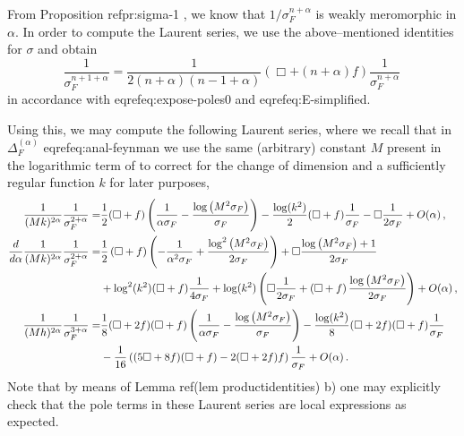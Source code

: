 \documentclass[10pt]{book}
\theoremstyle{break}
\begin{document}
\bigskip


From Proposition ref{pr:sigma-1} , we know that $1/\sigma^{n+\alpha}_F$ is weakly meromorphic in $\alpha$. In order to compute the Laurent series, we use the above--mentioned identities for $\sigma$ and obtain
$$
\frac{1}{\sigma^{n+1+\alpha}_F}=\frac{1}{2(n+\alpha)(n-1+\alpha)}\left(\Box+(n+\alpha)f\right)\frac{1}{\sigma^{n+\alpha}_F}\,
$$
in accordance with eqref{eq:expose-poles0} and eqref{eq:E-simplified}.


\bigskip


Using this, we may compute the following Laurent series, where we recall that in $\Delta^{(\alpha)}_F$ eqref{eq:anal-feynman} we use the same (arbitrary) constant $M$ present in the logarithmic term  of %
to correct for the change of dimension and a sufficiently regular function $k$ for later purposes,
\begin{align}\frac{1}{(Mk)^{2\alpha}}\frac{1}{\sigma^{2+\alpha}_F}=&\frac{1}{2}(\Box+f)\left(\frac{1}{\alpha\sigma_F}-\frac{\log \left(M^2 \sigma_F\right)}{\sigma_F}\right)-\frac{\log(k^2)}{2}(\Box+f)\frac{1}{\sigma_F}-\Box \frac{1}{2\sigma_F}+O(\alpha)\,,\notag\\
\frac{d}{d\alpha}\frac{1}{(Mk)^{2\alpha}}\frac{1}{\sigma^{2+\alpha}_F}=&\frac12\left(\Box+f\right)\left(-\frac{1}{\alpha^2 \sigma_F}+\frac{\log^2 \left(M^2 \sigma_F\right)}{2\sigma_F}\right)+\Box\frac{\log \left(M^2 \sigma_F\right)+1}{2\sigma_F}\\&+\log^2(k^2)(\Box+f)\frac{1}{4\sigma_F}+\log(k^2)\left(\Box\frac{1}{2\sigma_F}+\left(\Box+f\right)\frac{\log \left(M^2\sigma_F\right)}{2\sigma_F}\right)+O(\alpha)\,,\notag\\
\frac{1}{(M h)^{2\alpha}}\frac{1}{\sigma^{3+\alpha}_F}=&\frac{1}{8}(\Box+2f)(\Box+f)\left(\frac{1}{\alpha\sigma_F}-\frac{\log \left(M^2 \sigma_F\right)}{\sigma_F}\right)-\frac{\log(k^2)}{8}(\Box+2f)(\Box+f)\frac{1}{\sigma_F}\notag\\&-\frac{1}{16} \left((5\Box+8f)(\Box+f)-2(\Box+2f)f\right) \frac{1}{\sigma_F}+O(\alpha)\,.\notag\end{align}
%
Note that by means of Lemma ref(lem productidentities) b) one may explicitly check that the pole terms in these Laurent series are local expressions as expected.

\bigskip
\end{document}

